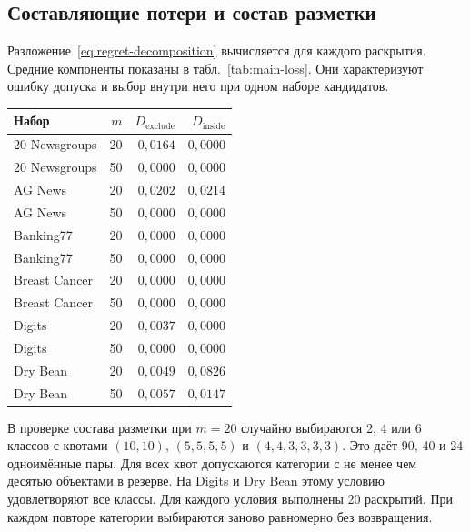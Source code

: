 \subsection{Составляющие потери и состав разметки}
Разложение~\eqref{eq:regret-decomposition} вычисляется для каждого раскрытия. Средние компоненты показаны в табл.~\ref{tab:main-loss}. Они характеризуют ошибку допуска и выбор внутри него при одном наборе кандидатов.

\begingroup\small
\begin{exampletable}\small
\caption{Составляющие потери M6 в основной серии.}\label{tab:main-loss}
\begin{tabular}{lrrr}
\toprule Набор & $m$ & $D_{\mathrm{exclude}}$ & $D_{\mathrm{inside}}$\\\midrule
20 Newsgroups & 20 & $0{,}0164$ & $0{,}0000$\\
20 Newsgroups & 50 & $0{,}0000$ & $0{,}0000$\\
AG News & 20 & $0{,}0202$ & $0{,}0214$\\
AG News & 50 & $0{,}0000$ & $0{,}0000$\\
Banking77 & 20 & $0{,}0000$ & $0{,}0000$\\
Banking77 & 50 & $0{,}0000$ & $0{,}0000$\\
Breast Cancer & 20 & $0{,}0000$ & $0{,}0000$\\
Breast Cancer & 50 & $0{,}0000$ & $0{,}0000$\\
Digits & 20 & $0{,}0037$ & $0{,}0000$\\
Digits & 50 & $0{,}0000$ & $0{,}0000$\\
Dry Bean & 20 & $0{,}0049$ & $0{,}0826$\\
Dry Bean & 50 & $0{,}0057$ & $0{,}0147$\\
\bottomrule\end{tabular}\end{exampletable}
\endgroup

В проверке состава разметки при $m=20$ случайно выбираются 2, 4 или 6 классов с квотами $(10,10)$, $(5,5,5,5)$ и $(4,4,3,3,3,3)$. Это даёт 90, 40 и 24 одноимённые пары. Для всех квот допускаются категории с не менее чем десятью объектами в резерве. На Digits и Dry Bean этому условию удовлетворяют все классы. Для каждого условия выполнены 20 раскрытий. При каждом повторе категории выбираются заново равномерно без возвращения.

